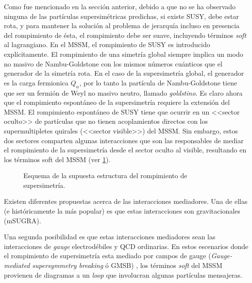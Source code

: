 Como fue mencionado en la sección anterior, debido a que no se ha observado
ninguna de las partículas supersimétricas predichas, si existe SUSY, debe estar
rota, y para mantener la solución al problema de jerarquía incluso en presencia
del rompimiento de ésta, el rompimiento debe ser suave, incluyendo términos
\emph{soft} al lagrangiano.
En el MSSM, el rompimiento de SUSY es introducido explícitamente. El rompimiento
de una simetría global siempre implica un modo no masivo de Nambu-Goldstone con
los mismos números cuánticos que el generador de la simetría rota. En el caso de
la supersimetría global, el generador es la carga fermionica $Q_\alpha$, por lo
tanto la partícula de Nambu-Goldstone tiene que ser un fermión de Weyl no masivo
neutro, llamado \emph{goldstino}. Es claro ahora que el rompimiento espontáneo
de la supersimetría requiere la extensión del MSSM. El rompimiento espontáneo de
SUSY tiene que ocurrir en un <<sector oculto>> de partículas que no tienen
acoplamientos directos con los supermultipletes quirales (<<sector visible>>)
del MSSM. Sin embargo, estos dos sectores comparten algunas interacciones que
son las responsables de mediar el rompimiento de la supersimetría desde el
sector oculto al visible, resultando en los términos soft del MSSM (ver
\cref{fig:susy_breaking}).

\begin{figure}[!htbp]
  \centering
  
  \caption{Esquema de la supuesta estructura del rompimiento de supersimetría.}
  \label{fig:susy_breaking}
\end{figure}

Existen diferentes propuestas acerca de las interacciones mediadores. Una
de ellas (e históricamente la más popular) es que estas interacciones son
gravitacionales (mSUGRA).


Una segunda posibilidad es que estas interacciones mediadores sean las
interacciones de \emph{gauge} electrodébiles y QCD ordinarias. En estos escenarios
donde el rompimiento de supersimetría esta mediado por campos de gauge
(\emph{Gauge-mediated supersymmetry breaking} ó GMSB) \cite{arxiv:9801271}, los términos
\emph{soft} del MSSM provienen de diagramas a un \emph{loop} que involucran algunas partículas
mensajeras.

